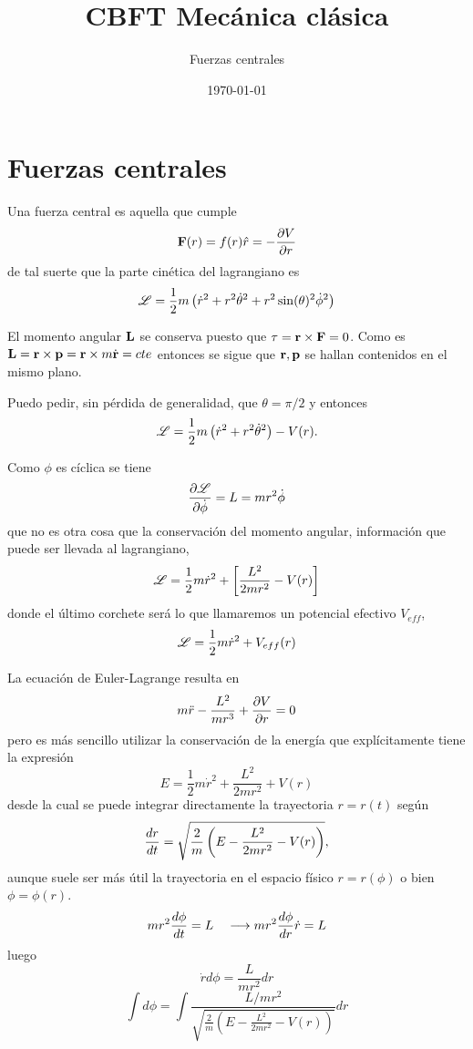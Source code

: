 \documentclass[10pt,oneside]{CBFT_article}
\title{CBFT Mecánica clásica}
\author{Fuerzas centrales}
\date{\today}
\begin{document}
\maketitle
\tableofcontents

\section{Fuerzas centrales}

Una fuerza central es aquella que cumple
\[
	\vb{F}(r) = f(r)\hat{r} = - \dpar{V}{r}
\]
de tal suerte que la parte cinética del lagrangiano es 
\[
	\mathscr{L} = \frac{1}{2}m \left( \dot{r}^2 + r^2 \dot{\theta}^2 + r^2 \sin(\theta)^2\dot{\phi}^2 \right)
\]

El momento angular $\vb{L}$ se conserva puesto que $\vb{\tau} = \vb{r} \times \vb{F}=0$. Como es 
$\vb{L} = \vb{r} \times \vb{p} = \vb{r} \times m\dot{\vb{r}} = cte$ entonces se sigue que $\vb{r},\vb{p}$
se hallan contenidos en el mismo plano.

Puedo pedir, sin pérdida de generalidad, que $\theta=\pi/2$ y entonces 
\[
	\mathscr{L} = \frac{1}{2}m \left( \dot{r}^2 + r^2 \dot{\theta}^2 \right) - V(r).
\]

Como $\phi$ es cíclica se tiene
\[
	\frac{\partial^{\hspace{-0.05em}} {\mathscr{L}}}{\partial {\dot{\phi}}^{\hspace{-0.05em}}} = L = mr^2\dot{\phi}
\]
que no es otra cosa que la conservación del momento angular, información que puede ser llevada al
lagrangiano,
\[
	\mathscr{L} = \frac{1}{2}m \dot{r}^2 + \left[ \frac{L^2}{2 m r^2} - V(r) \right]
\]
donde el último corchete será lo que llamaremos un potencial efectivo $V_{eff}$,
\[
	\mathscr{L} = \frac{1}{2}m \dot{r}^2 + V_{eff}(r)
\]

La ecuación de Euler-Lagrange resulta en
\[
	m\ddot{r} - \frac{L^2}{mr^3} + \frac{\partial^{\hspace{-0.05em}} {V}}{\partial {r}^{\hspace{-0.05em}}} = 0
\]
pero es más sencillo utilizar la conservación de la energía que explícitamente tiene la expresión
\[
	E = \frac{1}{2}m \dot{r}^2 + \frac{L^2}{2 m r^2} + V(r)
\]
desde la cual se puede integrar directamente la trayectoria $r=r(t)$ según
\[
	\frac{d^{\hspace{-0.05em}} {r}}{d {t}^{\hspace{-0.05em}}} = \sqrt{ \frac{2}{m}\left( E - \frac{L^2}{2 m r^2} - V(r) \right)},
\]
aunque suele ser más útil la trayectoria en el espacio físico $r=r(\phi)$ o bien $\phi=\phi(r)$.
\[
	m r^2 \frac{d^{\hspace{-0.05em}} {\phi}}{d {t}^{\hspace{-0.05em}}} = L \quad \longrightarrow m r^2 \frac{d^{\hspace{-0.05em}} {\phi}}{d {r}^{\hspace{-0.05em}}} \dot{r} = L
\]
luego
\[
	\dot{r} d\phi = \frac{L}{m r^2} dr
\]
\[
	\int d\phi = \int \frac{L/mr^2}{\sqrt{ \frac{2}{m}\left( E - \frac{L^2}{2 m r^2} - V(r) \right)}}dr
\]
\end{document}
